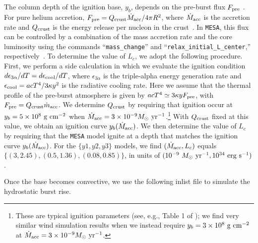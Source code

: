 \documentclass[apj,usenatbib, iop, twocolappendix]{emulateapj}
\begin{document}
The column depth of the ignition base, $y_b$, depends on the pre-burst flux $F_{\rm pre}$  \citep{Bildsten:98, Cumming:00}.  For pure helium accretion, $F_{\rm pre}=Q_{\rm crust} \dot{M}_{\rm acc}/4\pi R^2$,  where $\dot{M}_{\rm acc}$ is the accretion rate and $Q_{\rm crust}$ is the energy release per nucleon in the crust~\citep{Brown:98, Cumming:03, Cumming:06}. In \texttt{MESA}, this flux can be controlled by a combination of the mass accretion rate and the core luminosity using the commands ``\texttt{mass\_change}''  and ``\texttt{relax\_initial\_L\_center},'' respectively~\citep{Paxton:11}.
To determine the value of $L_c$, we adopt the following procedure.  First, we 
perform a side calculation in which we evaluate the ignition condition
$d\epsilon_{3\alpha}/dT = d\epsilon_{\rm cool}/dT$,
where $\epsilon_{3\alpha}$ is the triple-alpha energy generation rate and $\epsilon_{\rm cool}=a c T^4/3\kappa y^2$ is the radiative cooling rate.  Here we assume that the thermal profile of the pre-burst atmosphere is given by $acT^4\simeq 3\kappa y F_{\rm pre}$, with $F_{\rm pre}=Q_{\rm crust} \dot{m}_{\rm acc}$.   We determine $Q_{\rm crust}$ by requiring that ignition occur at $y_b=5\times10^{8}\ {\rm g\ cm^{-2}}$ when $\dot{M}_{\rm acc}=3\times10^{-9} M_\odot\ {\rm yr}^{-1}$.\footnote{ These are typical ignition parameters (see, e.g., Table 1 of ); we find very similar wind simulation results when we instead require $y_b=3\times10^8\ {\rm g\ cm^{-2}}$ at $\dot{M}_{\rm acc}=3\times10^{-9} M_\odot\ {\rm yr}^{-1}$.}  With $Q_{\rm crust}$ fixed at this value, we obtain an ignition curve $y_b(\dot{M}_{\rm acc})$.  We then determine the value of  $L_c$ by requiring that the \texttt{MESA} model ignite at a depth that matches the ignition curve $y_b(\dot{M}_{\rm acc})$.  For the $\{y1, y2, y3\}$ models, we find $(\dot{M}_{\rm acc}, L_c)$ equals $\{(3, 2.45), (0.5, 1.36), (0.08, 0.85)\}$,  in units of $(10^{-9}\ M_\odot\ {\rm yr}^{-1}, 10^{34}\ {\rm erg\ s^{-1}})$.

Once the base becomes convective, we use the following inlist file to simulate the hydrostatic burst rise.
\end{document}

